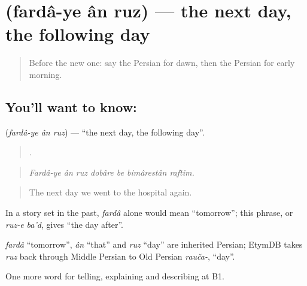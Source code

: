 \section[\texorpdfstring{\fa{فردای} \fa{آن} \fa{روز} (fardâ-ye ân ruz)}{فردای آن روز (fardâ-ye ân ruz)}]{   (fardâ-ye ân ruz) — the next day, the following day}

\label{lesson:FA-C305-farda-ye-an-ruz}



\begin{quote}
Before the new one: say the Persian for dawn, then the Persian for early morning.
\end{quote}

\subsection*{You'll want to know:   }
\textbf{  } (\emph{fardâ-ye ân ruz}) — \textquotedblleft{}the next day, the following day\textquotedblright{}.

\begin{quote}
      .
\end{quote}

\begin{quote}
\emph{Fardâ-ye ân ruz dobâre be bimârestân raftim.}
\end{quote}

\begin{quote}
The next day we went to the hospital again.
\end{quote}

In a story set in the past, \emph{fardâ} alone would mean \textquotedblleft{}tomorrow\textquotedblright{}; this phrase, or \emph{ruz-e ba'd}, gives \textquotedblleft{}the day after\textquotedblright{}.

\begin{cousinweb}
\emph{fardâ} \textquotedblleft{}tomorrow\textquotedblright{}, \emph{ân} \textquotedblleft{}that\textquotedblright{} and \emph{ruz} \textquotedblleft{}day\textquotedblright{} are inherited Persian; EtymDB takes \emph{ruz} back through Middle Persian to Old Persian \emph{rauča-}, \textquotedblleft{}day\textquotedblright{}.
\end{cousinweb}

\begin{grammarlens}[title={What you've built}]
One more word for telling, explaining and describing at B1.
\end{grammarlens}

